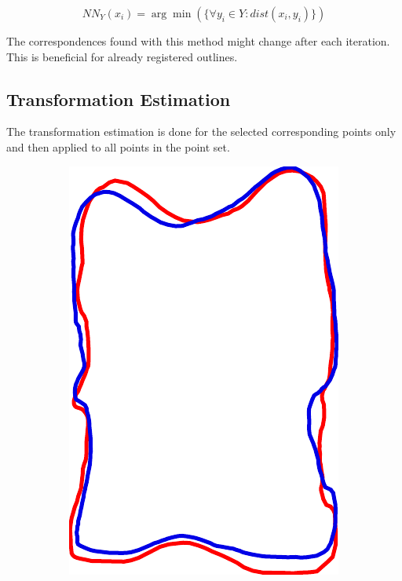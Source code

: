 \documentclass[pdftex,12pt,a4paper]{report}
\begin{document}
\begin{equation}
NN_Y(x_i) = \arg\min(\{ \forall y_i \in Y: dist(x_i, y_i) \})
\end{equation}

The correspondences found with this method might change after each iteration. This is beneficial for already registered
outlines.

\subsection{Transformation Estimation}

The transformation estimation is done for the selected corresponding points only and then applied to all points in
the point set.

\begin{figure}[h]
	\centering
	\begin{subfigure}[b]{0.24\textwidth}
		\centering
		\includegraphics[width=.9\linewidth]{img/registration/single-before.pdf}

\end{subfigure}
\end{figure}
\end{document}
